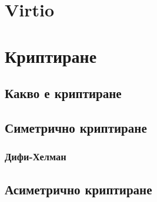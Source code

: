 \section{Virtio}

\section{Криптиране}
  \subsection{Какво е криптиране}

  \subsection{Симетрично криптиране}
    \subsubsection{Дифи-Хелман}

  \subsection{Асиметрично криптиране}

